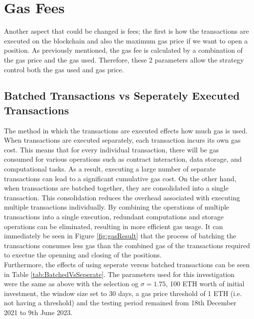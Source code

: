 \section{Gas Fees}
Another aspect that could be changed is fees; the first is how the transactions are executed on the blockchain and also the maximum gas price if we want to open a position. As previously mentioned, the gas fee is calculated by a combination of the gas price and the gas used. Therefore, these 2 parameters allow the strategy control both the gas used and gas price.

\subsection{Batched Transactions vs Seperately Executed Transactions}
The method in which the transactions are executed effects how much gas is used. When transactions are executed separately, each transaction incurs its own gas cost. This means that for every individual transaction, there will be gas consumed for various operations such as contract interaction, data storage, and computational tasks. As a result, executing a large number of separate transactions can lead to a significant cumulative gas cost. On the other hand, when transactions are batched together, they are consolidated into a single transaction. This consolidation reduces the overhead associated with executing multiple transactions individually. By combining the operations of multiple transactions into a single execution, redundant computations and storage operations can be eliminated, resulting in more efficient gas usage. It can immediately be seen in Figure \ref{fig:gasResult} that the process of batching the transactions consumes less gas than the combined gas of the transactions required to exectue the openning and closing of the positions.
\\[5mm]
Furthermore, the effects of using seperate versus batched transactions can be seen in Table \ref{tab:BatchedVsSeperate}. The parameters used for this investigation were the same as above with the selection og $\sigma = 1.75$, 100 ETH worth of initial investment, the window size set to 30 days, a gas price threshold of 1 ETH (i.e. not having a threshold) and the testing period remained from 18th December 2021 to 9th June 2023.

